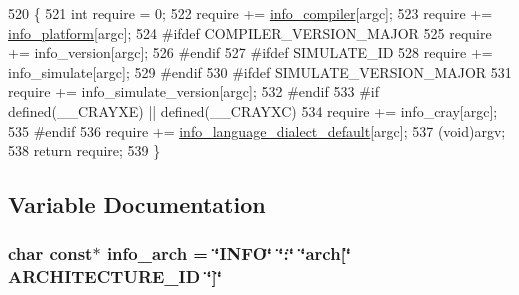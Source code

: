 \begin{DoxyCode}
520 \{
521   \textcolor{keywordtype}{int} require = 0;
522   require += \hyperlink{a00015_a4b0efeb7a5d59313986b3a0390f050f6_a4b0efeb7a5d59313986b3a0390f050f6}{info\_compiler}[argc];
523   require += \hyperlink{a00015_a2321403dee54ee23f0c2fa849c60f7d4_a2321403dee54ee23f0c2fa849c60f7d4}{info\_platform}[argc];
524 \textcolor{preprocessor}{#ifdef COMPILER\_VERSION\_MAJOR}
525   require += info\_version[argc];
526 \textcolor{preprocessor}{#endif}
527 \textcolor{preprocessor}{#ifdef SIMULATE\_ID}
528   require += info\_simulate[argc];
529 \textcolor{preprocessor}{#endif}
530 \textcolor{preprocessor}{#ifdef SIMULATE\_VERSION\_MAJOR}
531   require += info\_simulate\_version[argc];
532 \textcolor{preprocessor}{#endif}
533 \textcolor{preprocessor}{#if defined(\_\_CRAYXE) || defined(\_\_CRAYXC)}
534   require += info\_cray[argc];
535 \textcolor{preprocessor}{#endif}
536   require += \hyperlink{a00015_a1ce162bad2fe6966ac8b33cc19e120b8_a1ce162bad2fe6966ac8b33cc19e120b8}{info\_language\_dialect\_default}[argc];
537   (void)argv;
538   \textcolor{keywordflow}{return} require;
539 \}
\end{DoxyCode}


\subsection{Variable Documentation}
\subsubsection[{\texorpdfstring{info\+\_\+arch}{info_arch}}]{\setlength{\rightskip}{0pt plus 5cm}char const$\ast$ info\+\_\+arch = \char`\"{}I\+N\+FO\char`\"{} \char`\"{}\+:\char`\"{} \char`\"{}arch\mbox{[}\char`\"{} A\+R\+C\+H\+I\+T\+E\+C\+T\+U\+R\+E\+\_\+\+ID \char`\"{}\mbox{]}\char`\"{}}\hypertarget{a00015_a59647e99d304ed33b15cb284c27ed391_a59647e99d304ed33b15cb284c27ed391}{}\label{a00015_a59647e99d304ed33b15cb284c27ed391_a59647e99d304ed33b15cb284c27ed391}
